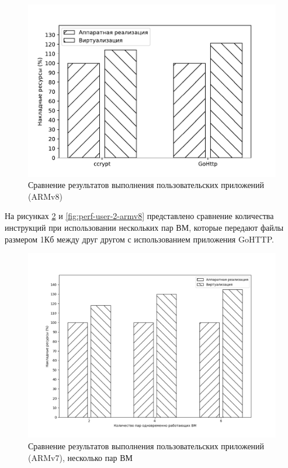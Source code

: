 \begin{figure}[h]
	\centering
	\includegraphics[width=\textwidth]{img/user-1-armv8.pdf}
	\caption{Сравнение результатов выполнения пользовательских приложений (ARMv8)}
	\label{fig:perf-user-1-armv8}
\end{figure}

На рисунках \ref{fig:perf-user-2-armv7} и \ref{fig:perf-user-2-armv8} представлено сравнение количества инструкций при использовании нескольких пар ВМ, которые передают файлы размером 1Кб между друг другом с использованием приложения GoHTTP.

\begin{figure}[h]
	\centering
	\includegraphics[width=\textwidth]{img/user-2-armv7.pdf}
	\caption{Сравнение результатов выполнения пользовательских приложений (ARMv7), несколько пар ВМ}
	\label{fig:perf-user-2-armv7}
\end{figure}

